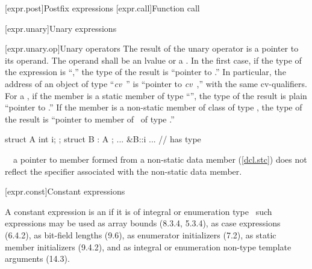 \documentclass[american]{book}
\begin{document}
[expr.post]{Postfix expressions}
\setcounter{subsection}{1}
[expr.call]{Function call}

[expr.unary]{Unary expressions}

[expr.unary.op]{Unary operators}
\setcounter{Paras}{1}
\pnum
{}%
%
The result of the unary
\tcode{\&}
operator is a pointer to its operand.
The operand shall be an lvalue or a
.
In the first case, if the type of the expression is ``,''
the type of the result is ``pointer to
.''
In particular, the address of an object of type ``\textit{cv}\ ''
is ``pointer to \textit{cv}\ ,'' with the same cv-qualifiers.
%
For a
,
if the member is a static member of type ``'',
the type of the result is plain ``pointer to
.''
If the member is a non-static member of class
of type
,
the type of the result is
``pointer to member of \ of type
.''
\enterexample\ 

\begin{codeblock}
struct A { int i; };
struct B : A { };
... &B::i ...                 // has type 
\end{codeblock}
\exitexample\ 
\enternote\ 
a pointer to member formed from a
non-static data member (\ref{dcl.stc}) does not reflect the
\tcode{mutable}
specifier associated with the non-static data member.
\exitnote\ 

\setcounter{section}{18}
[expr.const]{Constant expressions}

\setcounter{Paras}{2}
\pnum
A constant expression is an  if
it is of integral or enumeration type  \enternote\ such
expressions may be used as array bounds (8.3.4, 5.3.4), as case
expressions (6.4.2), as bit-field lengths (9.6), as enumerator
initializers (7.2), as static member initializers (9.4.2), and as
integral or enumeration non-type template arguments (14.3). \exitnote\
\end{document}
